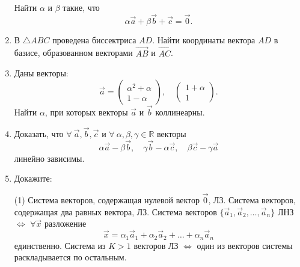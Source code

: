\begin{enumerate}
	 Найти $\alpha$ и $\beta$ такие, что
	 $$\alpha \vec a + \beta \vec b + \vec c = \vec 0.$$
	 
 	\item В $\triangle ABC$ проведена биссектриса $AD$. Найти координаты вектора $AD$ в базисе, образованном векторами $\overrightarrow{AB}$ и $\overrightarrow{AC}$.

	 
	 \item Даны векторы:
	 $$\vec a = \begin{pmatrix}
	 	\alpha^2+\alpha \\ 1 - \alpha
	 \end{pmatrix},
	 \quad
	 \begin{pmatrix}
	 	1+\alpha \\ 1
	 \end{pmatrix}.$$
	 Найти $\alpha$, при которых векторы $\vec a$ и $\vec b$ коллинеарны.
	 
	 \item Доказать, что $\forall\ {\vec a, \vec b, \vec c}$ и $\forall\ {\alpha, \beta, \gamma} \in \mathbb{R}$ векторы
	 $$\alpha \vec a - \beta \vec b,\quad \gamma \vec b -\alpha \vec c, \quad \beta \vec c - \gamma \vec a$$
	 линейно зависимы.
	 
	\newpage
	\item Докажите:
	\begin{tasks}(1)
		\task Система векторов, содержащая нулевой вектор $\vec 0$, ЛЗ.
		\task Система векторов, содержащая два равных вектора, ЛЗ.  
		\task Система векторов $\{\vec a_1, \vec a_2, \dots, \vec a_n\}$ ЛНЗ $\iff$ $\forall \vec x$ разложение
		$$\vec x = \alpha_1 \vec a_1 + \alpha_2 \vec a_2 + \dots + \alpha_n \vec a_n$$
		единственно. 
		\task Система из $K>1$ векторов ЛЗ $\iff$ один из векторов системы раскладывается по остальным.
	\end{tasks}
\end{enumerate}